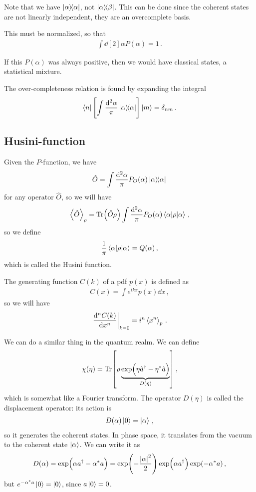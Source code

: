 \documentclass[main.tex]{subfiles}
\begin{document}
Note that we have \(\dyad{\alpha }\), not \(\ketbra{\alpha }{\beta }\).
This can be done since the coherent states are not linearly independent, they are an overcomplete basis. 

This must be normalized, so that 
%
\begin{align}
\int \dd[2]{\alpha } P(\alpha ) = 1
\,.
\end{align}

If this \(P(\alpha )\) was always positive, then we would have classical states, a statistical mixture. 

The over-completeness relation is found by expanding the integral 
%
\begin{align}
\bra{n} \qty[ \int \frac{ \dd[2]{\alpha }}{\pi } \dyad{\alpha }] \ket{m} = \delta_{nm}
\,.
\end{align}

\subsection{Husini-function}

Given the \(P\)-function, we have 
%
\begin{align}
\hat{O} = \int \frac{\dd[2]{\alpha}}{\pi } P_O (\alpha ) \dyad{\alpha }
\,
\end{align}
%
for any operator \(\hat{O}\), so we will have 
%
\begin{align}
\expval{\hat{O}}_{\rho } = \Tr(\hat{O}\rho ) \int \frac{ \dd[2]{\alpha }}{\pi  } P_O(\alpha ) \ev{\rho }{\alpha }
\,,
\end{align}
%
so we define 
%
\begin{align}
\frac{1}{\pi } \ev{\rho }{\alpha } = Q(\alpha )
\,,
\end{align}
%
which is called the Husini function.

The generating function \(C(k)\) of a pdf \(p(x)\) is defined as 
%
\begin{align}
C(x) = \int e^{ikx} p(x) \dd{x}
\,,
\end{align}
%
so we will have 
%
\begin{align}
\eval{\dv[n]{C(k)}{x}}_{k=0} = i^{n} \expval{x^{n}}_{p}
\,.
\end{align}

We can do a similar thing in the quantum realm. 
We can define 
%
\begin{align}
\chi (\eta ) = \Tr[\rho \underbrace{\exp(\eta \hat{a} ^\dag - \eta^{*} \hat{a})}_{D(\eta )}]
\,,
\end{align}
%
which is somewhat like a Fourier transform. The operator \(D(\eta )\) is called the displacement operator: its action is 
%
\begin{align}
D(\alpha ) \ket{0} = \ket{\alpha }
\,,
\end{align}
%
so it generates the coherent states. 
In phase space, it translates from the vacuum to the coherent state \(\ket{\alpha }\). We can write it as 
%
\begin{align}
D(\alpha ) = \exp(\alpha a ^\dag - \alpha^{*} a) 
= \exp(- \frac{\abs{\alpha }^2}{2}) \exp(\alpha a ^\dag) \exp(- \alpha^{*} a)
\,,
\end{align}
%
but \(e^{- \alpha^{*} a} \ket{0} = \ket{0}\), since \(a \ket{0} = 0\). 
\end{document}
